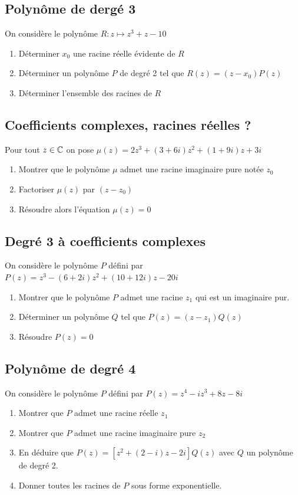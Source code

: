 \documentclass[oneside,12pt]{book}          %
\begin{document}
\subsection{Polynôme de dergé 3}
On considère le polynôme $R:z\mapsto z^3+z-10$
\begin{enumerate}
	\item Déterminer $x_0$ une racine réelle évidente de $R$
	\item Déterminer un polynôme $P$ de degré 2 tel que $R(z)=(z-x_0)P(z)$
	\item Déterminer l'ensemble des racines de $R$
\end{enumerate}


\subsection{Coefficients complexes, racines réelles ?}
Pour tout $z\in{\mathbb C}$  on pose $\mu(z)=2z^3+(3+6i)z^2+(1+9i)z+3i$
\begin{enumerate}
	\item Montrer que le polynôme $\mu$ admet une racine imaginaire pure notée $z_0$
	\item Factoriser $\mu(z)$ par $(z-z_0)$
	\item Résoudre alors l'équation $\mu(z)=0$
\end{enumerate}



\subsection{Degré 3 à coefficients complexes}
On considère le polynôme $P$ défini par $P(z)=z^3-(6+2i)z^2+(10+12i)z-20i$
\begin{enumerate}
    \item Montrer que le polynôme $P$ admet une racine $z_1$ qui est un imaginaire pur.
    \item Déterminer un polynôme $Q$ tel que $P(z)=(z-z_1)Q(z)$
    \item Résoudre $P(z)=0$
\end{enumerate}



\subsection{Polynôme de degré 4}
On considère le polynôme $P$ défini par $P(z)=z^4-iz^3+8z-8i$
\begin{enumerate}
	\item Montrer que $P$ admet une racine réelle $z_1$
	\item Montrer que $P$ admet une racine imaginaire pure $z_2$
	\item En déduire que $P(z)=\left[z^2+(2-i)z-2i\right]Q(z)$ avec $Q$ un polynôme de degré 2.
	\item Donner toutes les racines de $P$ sous forme exponentielle. 
\end{enumerate}
\end{document}
